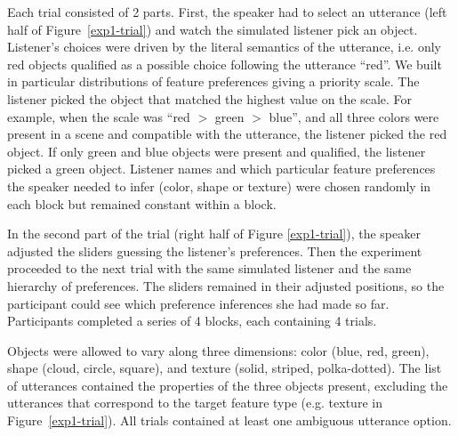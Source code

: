 \documentclass[10pt,a4paper]{article}
\begin{document}
Each trial consisted of 2 parts. 
First, the speaker had to select an utterance (left half of Figure~\ref{exp1-trial}) and watch the simulated listener pick an object. Listener's choices were driven by the literal semantics of the utterance, i.e. only red objects qualified as a possible choice following the utterance ``red''. We built in particular distributions of feature preferences giving a priority scale. The listener picked the object that matched the highest value on the scale. For example, when the scale was ``red $>$ green $>$ blue'', and all three colors were present in a scene and compatible with the utterance, the listener picked the red object. If only green and blue objects were present and qualified, the listener picked a green object. Listener names and which particular feature preferences the speaker needed to infer (color, shape or texture) were chosen randomly in each block but remained constant within a block.


In the second part of the trial (right half of Figure \ref{exp1-trial}), the speaker adjusted the sliders guessing the listener's preferences. Then the experiment proceeded to the next trial with the same simulated listener and the same hierarchy of preferences. The sliders remained in their adjusted positions, so the participant could see which preference inferences she had made so far. Participants completed a series of 4 blocks, each containing 4 trials. 

Objects were allowed to vary along three dimensions: color (blue, red, green), shape (cloud, circle, square), and texture (solid, striped, polka-dotted). The list of utterances contained the properties of the three objects present, excluding the utterances that correspond to the target feature type (e.g. texture in Figure~\ref{exp1-trial}). All trials contained at least one ambiguous utterance option. 

\end{document}

